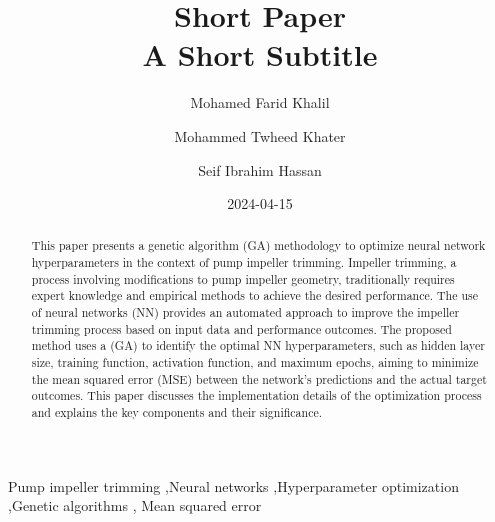 \documentclass[
  super,
  review,
  3p]{elsarticle}
\date{2024-04-15}
\begin{document}
\begin{frontmatter}
\title{Short Paper \\\large{A Short Subtitle} }
\author[1]{Mohamed Farid Khalil%
%
}
\author[1]{Mohammed Twheed Khater%
%
}
\author[1]{Seif Ibrahim Hassan%
%
}



        
\begin{abstract}
This paper presents a genetic algorithm (GA) methodology to optimize
neural network hyperparameters in the context of pump impeller trimming.
Impeller trimming, a process involving modifications to pump impeller
geometry, traditionally requires expert knowledge and empirical methods
to achieve the desired performance. The use of neural networks (NN)
provides an automated approach to improve the impeller trimming process
based on input data and performance outcomes. The proposed method uses a
(GA) to identify the optimal NN hyperparameters, such as hidden layer
size, training function, activation function, and maximum epochs, aiming
to minimize the mean squared error (MSE) between the network's
predictions and the actual target outcomes. This paper discusses the
implementation details of the optimization process and explains the key
components and their significance.
\end{abstract}





\begin{keyword}
    Pump impeller trimming \sep Neural networks \sep Hyperparameter
optimization \sep Genetic algorithms \sep 
    Mean squared error
\end{keyword}
\end{frontmatter}
    
\begin{nomenclature}
\begin{deflist}[AA] %

\end{deflist}

\begin{deflist}[AAA] %

\end{deflist}
\end{nomenclature}
\end{document}

